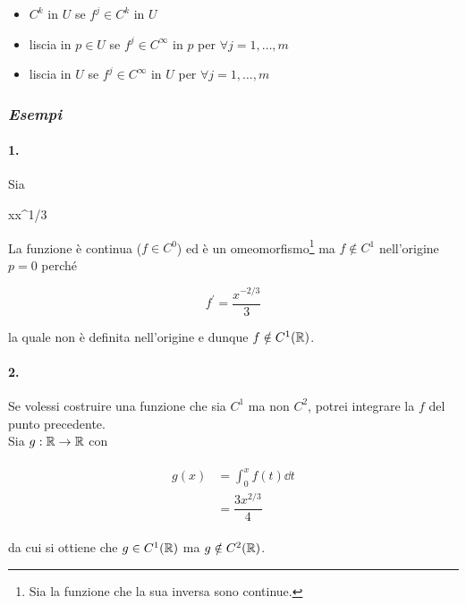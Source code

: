 \begin{itemize}
	\item $ C^{k} $ in $ U $ se $ f^{j} \in C^{k} $ in $ U $
	
	\item liscia in $ p \in U $ se $ f^{j} \in C^{\infty} $ in $ p $ per $ \forall j = 1, \dots, m $
	
	\item liscia in $ U $ se $ f^{j} \in C^{\infty} $ in $ U $ per $ \forall j = 1, \dots, m $
\end{itemize}

\subsubsection{\textit{Esempi}}

\paragraph{1.}

Sia

	{\R}{\R}
	{x}{x^{1/3}}
	
La funzione è continua ($ f \in C^{0} $) ed è un omeomorfismo\footnote{%
	Sia la funzione che la sua inversa sono continue.%
} ma $ f \notin C^{1} $ nell'origine $ p = 0 $ perché

\begin{equation}
	f^{\prime} = \dfrac{x^{-2/3}}{3}
\end{equation}

la quale non è definita nell'origine e dunque $ f \notin C^{1} (\mathbb{R}) $.

\paragraph{2.}

Se volessi costruire una funzione che sia $ C^{1} $ ma non $ C^{2} $, potrei integrare la $ f $ del punto precedente.\\
Sia $ g : \mathbb{R} \to \mathbb{R} $ con

\begin{align}
	\begin{split}
		g (x) &= \int_{0}^{x} f (t) \dd{t}\\
		&= \dfrac{3 x^{2/3}}{4}
	\end{split}
\end{align}

da cui si ottiene che $ g \in C^{1} (\mathbb{R}) $ ma $ g \notin C^{2} (\mathbb{R}) $.

